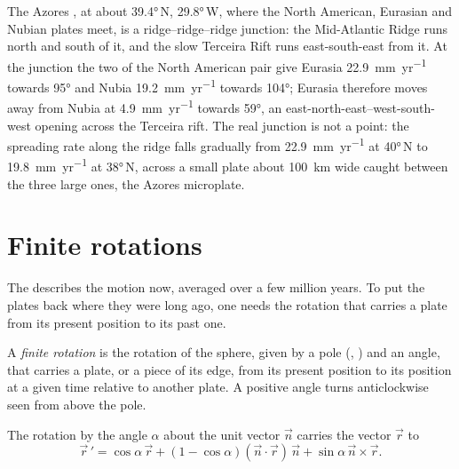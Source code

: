 The Azores , at about \ang{39.4}\,N, \ang{29.8}\,W, where the
North American, Eurasian and Nubian plates meet, is a ridge--ridge--ridge
junction: the Mid-Atlantic Ridge runs north and south of it, and the slow
Terceira Rift runs east-south-east from it. At the junction the two  of the North American pair give Eurasia \qty{22.9}{mm.yr^{-1}} towards
\ang{95} and Nubia \qty{19.2}{mm.yr^{-1}} towards \ang{104}; Eurasia therefore
moves away from Nubia at \qty{4.9}{mm.yr^{-1}} towards \ang{59}, an
east-north-east--west-south-west opening across the Terceira rift. The real
junction is not a point: the spreading rate along the ridge falls gradually
from \qty{22.9}{mm.yr^{-1}} at \ang{40}\,N to \qty{19.8}{mm.yr^{-1}} at
\ang{38}\,N, across a small plate about \qty{100}{km} wide caught between the
three large ones, the Azores microplate.

\section{Finite rotations}

The  describes the motion now, averaged over a few million years.
To put the plates back where they were long ago, one needs the rotation that
carries a plate from its present position to its past one.

\begin{definition}\label{def:b1:plate-kinematics:finite-rotation}
A \emph{finite rotation} is the rotation of the sphere,
given by a pole (, ) and an angle, that carries a plate, or a
piece of its edge, from its present position to its position at a given time
relative to another plate. A positive angle turns anticlockwise seen from above
the pole.
\end{definition}

\begin{proposition}\label{prop:b1:plate-kinematics:rodrigues}
The rotation by the angle $\alpha$ about the unit vector $\vec n$ carries the
vector $\vec r$ to
\[
  \vec r\,' = \cos\alpha\,\vec r + (1 - \cos\alpha)(\vec n\cdot\vec r)\,\vec n
  + \sin\alpha\,\vec n\times\vec r .
\]
\end{proposition}

